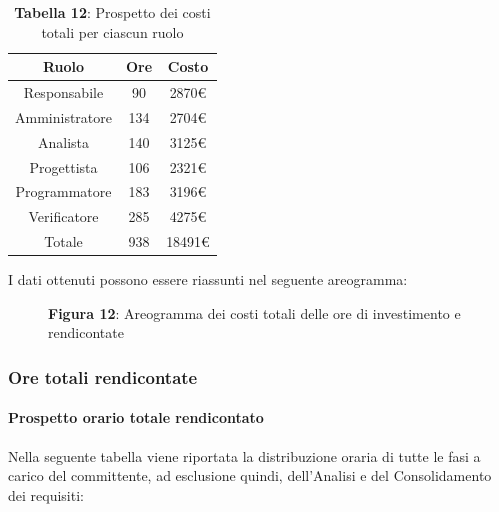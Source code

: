 \begin{table}[H]
	\centering
	\renewcommand{\arraystretch}{1.5}
	\begin{tabular}{|c|c|c|}
		\hline
		\rowcolor{lighter-grayer}
		Ruolo & Ore & Costo \\
		\hline
		Responsabile & 90 & 2870\euro \\
		\hline
		Amministratore & 134 & 2704\euro \\
		\hline
		Analista & 140 & 3125\euro \\
		\hline
		Progettista& 106 & 2321\euro \\
		\hline
		Programmatore & 183 & 3196\euro \\
		\hline
		Verificatore & 285 & 4275\euro \\
		\hline
		Totale & 938 &  18491\euro \\
		\hline
	\end{tabular}
	\caption*{\textbf{Tabella 12}: Prospetto dei costi totali per ciascun ruolo \\}
\end{table}

I dati ottenuti possono essere riassunti nel seguente areogramma:


\begin{figure}[H]
	\centering
	\caption*{\textbf{Figura 12}: Areogramma dei costi totali delle ore di investimento e rendicontate}
    \label{fig:Figura10}
\end{figure}

\subsubsection{Ore totali rendicontate}
\paragraph{Prospetto orario totale rendicontato}
Nella seguente tabella viene riportata la distribuzione oraria di tutte le fasi a carico del committente, ad esclusione quindi, dell'Analisi e del Consolidamento dei requisiti:

